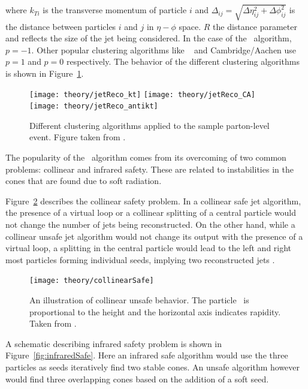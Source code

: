 where $k_{Ti}$ is the transverse momentum of particle $i$ and $\Delta_{ij} = \sqrt{\Delta\eta_{ij}^2 + \Delta\phi_{ij}^2}$ is the distance between particles $i$ and $j$ in $\eta-\phi$ space. $R$ the distance parameter and reflects the size of the jet being considered. In the case of the \antikt\ algorithm, $p = -1$. Other popular clustering algorithms like \kt\ \cite{Catani:1993hr} and Cambridge/Aachen \cite{Dokshitzer:1997in} use $p = 1$ and $p=0$ respectively. The behavior of the different clustering algorithms is shown in Figure~\ref{fig:JetClustering}. 

\begin{figure}[htp]
\centering
\texttt{[image: theory/jetReco\_kt]}\hfill
\texttt{[image: theory/jetReco\_CA]}\hfill
\texttt{[image: theory/jetReco\_antikt]}\hfill
\caption{Different clustering algorithms applied to the sample parton-level event. Figure taken from \cite{Cacciari:2008gp}.}
\label{fig:JetClustering}
\end{figure}

The popularity of the \antikt\ algorithm comes from its overcoming of two common problems: collinear and infrared safety. These are related to instabilities in the cones that are found due to soft radiation. 

Figure~\ref{fig:collinearSafe} describes the collinear safety problem. In a collinear safe jet algorithm, the presence of a virtual loop or a collinear splitting of a central particle would not change the number of jets being reconstructed. On the other hand, while a collinear unsafe jet algorithm would not change its output with the presence of a virtual loop, a splitting in the central particle would lead to the left and right most particles forming individual seeds, implying two reconstructed jets \cite{Salam:2009jx}.

\begin{figure}[htp]
\centering
\texttt{[image: theory/collinearSafe]}
\caption{An illustration of collinear unsafe behavior. The particle \pt\ is proportional to the height and the horizontal axis indicates rapidity. Taken from \cite{Salam:2009jx}. }
\label{fig:collinearSafe}
\end{figure}


A schematic describing infrared safety problem is shown in Figure~\ref{fig:infraredSafe}. Here an infrared safe algorithm would use the three particles as seeds iteratively find two stable cones. An unsafe algorithm however would find three overlapping cones based on the addition of a soft seed.

